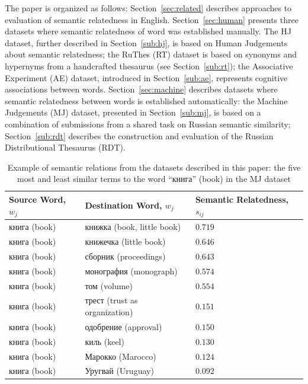 \documentclass[runningheads,a4paper]{llncs}
\begin{document}
The paper is organized as follows: Section~\ref{sec:related} describes approaches to evaluation of semantic relatedness in English.  Section~\ref{sec:human} presents three datasets where semantic relatedness of word was established manually. The HJ dataset, further described in Section~\ref{sub:hj}, is based on Human Judgements about semantic relatedness; the RuThes (RT) dataset is based on synonyms and hypernyms from a handcrafted thesaurus (see Section~\ref{sub:rt}); the Associative Experiment (AE) dataset, introduced in Section~\ref{sub:ae}, represents cognitive associations between words.  Section~\ref{sec:machine} describes datasets where semantic relatedness between words is established automatically: the Machine Judgements (MJ) dataset, presented in Section~\ref{sub:mj}, is based on a combination of submissions from a shared task on Russian semantic similarity; Section~\ref{sub:rdt} describes the construction and evaluation of the Russian Distributional Thesaurus (RDT).

\begin{table}[ht]
\scriptsize
\centering
\caption{Example of semantic relations from the datasets described in this paper: the five most and  least similar terms to the word ``книга'' (book) in the MJ dataset}
\label{tab:relations}
\begin{tabular}{lll}\toprule
\textbf{Source Word}, $w_j$ & \textbf{Destination Word}, $w_j$ & \textbf{Semantic Relatedness}, $s_{ij}$ \\ \midrule
книга (book) & книжка (book, little book)    & $0.719$ \\
книга (book) & книжечка (little book)        & $0.646$ \\
книга (book) & сборник (proceedings)         & $0.643$ \\
книга (book) & монография (monograph)        & $0.574$ \\
книга (book) & том (volume)                  & $0.554$ \\ \midrule
книга (book) & трест (trust as organization) & $0.151$ \\
книга (book) & одобрение (approval)          & $0.150$ \\
книга (book) & киль (keel)                   & $0.130$ \\
книга (book) & Марокко (Marocco)             & $0.124$ \\
книга (book) & Уругвай (Uruguay)             & $0.092$ \\ \bottomrule
\end{tabular}
\end{table}
\end{document}
